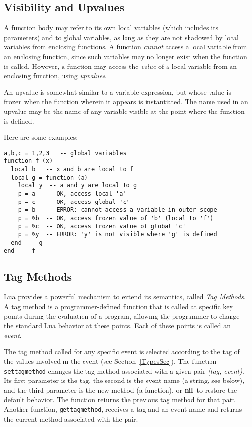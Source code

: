 \documentclass[11pt]{article}
\newcommand{\See}[1]{Section~\ref{#1}}
\newcommand{\see}[1]{(see \See{#1})}
\newcommand{\M}[1]{\emph{#1}}
\newcommand{\T}[1]{{\tt #1}}
\newcommand{\nil}{{\bf nil}}
\newcommand{\IndexVerb}[1]{\T{#1}\index{#1}}
\newcommand{\Def}[1]{\emph{#1}\index{#1}}
\begin{document}
\subsection{Visibility and Upvalues} \label{upvalue}
 

A function body may refer to its own local variables
(which includes its parameters) and to global variables,
as long as they are not shadowed by local
variables from enclosing functions.
A function \emph{cannot} access a local
variable from an enclosing function,
since such variables may no longer exist when the function is called.
However, a function may access the \emph{value} of a local variable
from an enclosing function, using \emph{upvalues}.

\begin{Produc}
\end{Produc}
An upvalue is somewhat similar to a variable expression,
but whose value is frozen when the function wherein it
appears is instantiated.
The name used in an upvalue may be the name of any variable visible
at the point where the function is defined.

Here are some examples:
\begin{verbatim}
a,b,c = 1,2,3   -- global variables
function f (x)
  local b   -- x and b are local to f
  local g = function (a)
    local y  -- a and y are local to g
    p = a   -- OK, access local 'a'
    p = c   -- OK, access global 'c'
    p = b   -- ERROR: cannot access a variable in outer scope
    p = %b  -- OK, access frozen value of 'b' (local to 'f')
    p = %c  -- OK, access frozen value of global 'c'
    p = %y  -- ERROR: 'y' is not visible where 'g' is defined
  end  -- g
end  -- f
\end{verbatim}


\subsection{Tag Methods} \label{tag-method}

Lua provides a powerful mechanism to extend its semantics,
called \Def{Tag Methods}.
A tag method is a programmer-defined function
that is called at specific key points during the evaluation of a program,
allowing the programmer to change the standard Lua behavior at these points.
Each of these points is called an \Def{event}.

The tag method called for any specific event is selected
according to the tag of the values involved
in the event \see{TypesSec}.
The function \IndexVerb{settagmethod} changes the tag method
associated with a given pair \M{(tag, event)}.
Its first parameter is the tag, the second is the event name
(a string, see below),
and the third parameter is the new method (a function),
or \nil\ to restore the default behavior.
The function returns the previous tag method for that pair.
Another function, \IndexVerb{gettagmethod},
receives a tag and an event name and returns the
current method associated with the pair.
\end{document}
